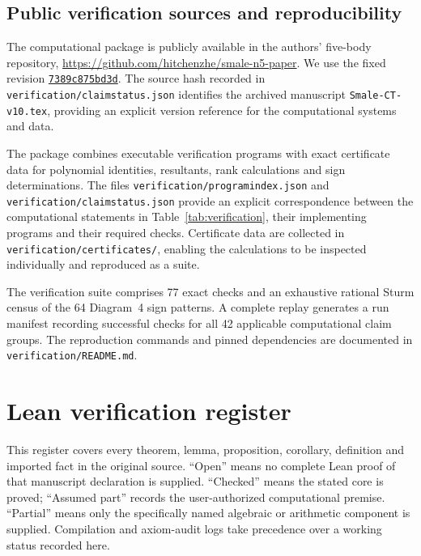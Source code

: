 \documentclass[Threeside,11pt]{article}
\theoremstyle{definition}
\theoremstyle{remark}
\numberwithin{equation}{section}
\theoremstyle{remark}
\newcommand{\code}[1]{\begingroup\def\_{\textunderscore\allowbreak}\texttt{#1}\endgroup}
\begin{document}
\subsection*{Public verification sources and reproducibility}
\label{app:public-verification-source}
The computational package is publicly available in the authors' five-body
repository,
\url{https://github.com/hitchenzhe/smale-n5-paper}.
We use the fixed revision
\href{https://github.com/hitchenzhe/smale-n5-paper/tree/7389c875bd3d8c5fa01617b4d27a3562118b8081}{\texttt{7389c875bd3d}}.
The source hash recorded in \code{verification/claim\_status.json}
identifies the archived manuscript \code{Smale\_5-CT-v10.tex}, providing
an explicit version reference for the computational systems and data.

The package combines executable verification programs with exact certificate
data for polynomial identities, resultants, rank calculations and sign
determinations. The files \code{verification/program\_index.json} and
\code{verification/claim\_status.json} provide an explicit correspondence
between the computational statements in Table~\ref{tab:verification},
their implementing programs and their required checks. Certificate data are
collected in \code{verification/certificates/}, enabling the calculations
to be inspected individually and reproduced as a suite.

The verification suite comprises 77 exact checks and an exhaustive rational
Sturm census of the 64 Diagram~4 sign patterns. A complete replay generates
a run manifest recording successful checks for all 42 applicable
computational claim groups. The reproduction commands and pinned dependencies
are documented in \code{verification/README.md}.


\section{Lean verification register}
\label{app:lean-register}
This register covers every theorem, lemma, proposition, corollary, definition
and imported fact in the original source. ``Open'' means no complete Lean
proof of that manuscript declaration is supplied. ``Checked'' means the stated
core is proved; ``Assumed part'' records the user-authorized computational premise.
``Partial'' means only the
specifically named algebraic or arithmetic component is supplied. Compilation
and axiom-audit logs take precedence over a working status recorded here.
\end{document}
